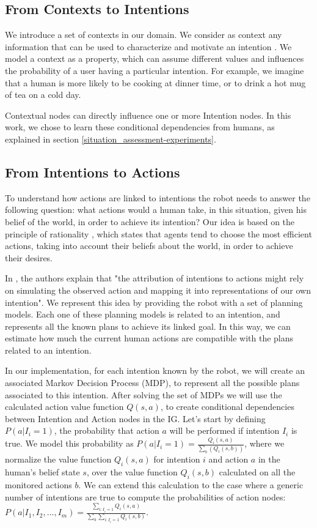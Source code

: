 \subsection{From Contexts to Intentions}
We introduce a set of contexts in our domain. We consider as context any information that can be used to characterize and motivate an intention \cite{abowd1999towards}. We model a context  as a property, which can assume different values and influences the probability of a user having a particular intention. For example, we imagine that a human is more likely to be cooking at dinner time, or to drink a hot mug of tea on a cold day.

Contextual nodes can directly influence one or more Intention nodes. In this work, we chose to learn these conditional dependencies from humans, as explained in section \ref{situation_assessment-experiments}.

\subsection{From Intentions to Actions}
\label{sec:situation_assessment-action_evaluation}
To understand how actions are linked to intentions the robot needs to answer the following question: what actions would a human take, in this situation, given his belief of the world, in order to achieve its intention?
Our idea is based on the principle of rationality \cite{Dennet1989}, which states that agents tend to choose the most efficient actions, taking into account their beliefs about the world, in order to achieve their desires.

In \cite{Blakemore2001}, the authors explain that "the attribution of intentions to actions might rely on simulating the observed action and mapping it into representations of our own intention". We represent this idea by providing the robot with a set of planning models. Each one of these planning models is related to an intention, and represents all the known plans to achieve its linked goal. In this way, we can estimate how much the current human actions are compatible with the plans related to an intention.

In our implementation, for each intention known by the robot, we will create an associated Markov Decision Process (MDP), to represent all the possible plans associated to this intention. After solving the set of MDPs we will use the calculated action value function \(Q(s,a)\), to create conditional dependencies between Intention and Action nodes in the IG. Let's start by defining \(P(a|I_i=1)\), the probability that action $a$ will be performed if intention $I_i$ is true. We model this probability as \(P(a|I_i=1)=\frac{Q_i(s,a)}{\sum_b(Q_i(s,b))}\), where we normalize the value function $Q_i(s,a)$ for intention $i$ and action $a$ in the human's belief state $s$, over the value function $Q_i(s,b)$ calculated on all the monitored actions $b$. We can extend this calculation to the case where a generic number of intentions are true to compute the probabilities of action nodes: \(P(a|I_1,I_2,...,I_m)=\frac{\sum_{i:I_i=1}Q_i(s,a)}{\sum_b\sum_{i:I_i=1}Q_i(s,b)}\).

